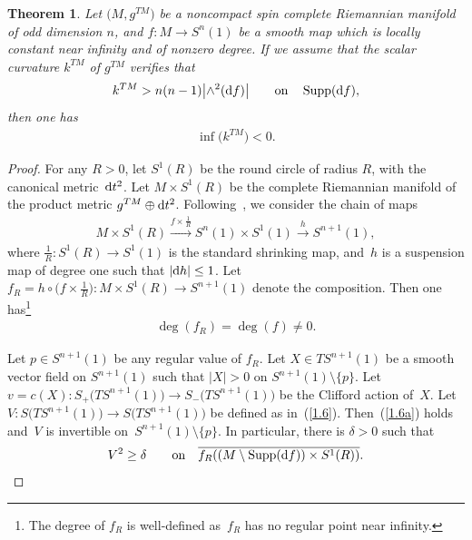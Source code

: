 \documentclass[pdftex]{sigma}
\numberwithin{equation}{section}
\newtheorem{thm}{Theorem}[section]
\theoremstyle{definition}
\begin{document}
\begin{thm}\label{t1.4} Let $\big(M,g^{TM}\big)$ be a noncompact spin complete Riemannian manifold of odd dimension $n$, and $f\colon M\rightarrow S^n(1)$ be a smooth map which is locally constant near infinity and of nonzero degree. If we assume that the scalar curvature $k^{TM}$ of $g^{TM}$ verifies that
\begin{gather}\label{1.24}
k^{TM}> n(n-1)\big|{\wedge}^2({\rm d}f)\big| \qquad {\rm on}\quad \operatorname{Supp}({\rm d}f),
\end{gather}
then one has
\begin{gather}\label{1.25}
\inf\big(k^{TM}\big)<0.
\end{gather}
\end{thm}

\begin{proof} For any $R>0$, let $S^1(R)$ be the round circle of radius $R$, with the canonical met\-ric~${\rm d}t^2$. Let $M\times S^1(R)$ be the complete Riemannian manifold of the product metric $g^{TM}\oplus {\rm d}t^2$. Follo\-wing~\cite{L98}, we consider the chain of maps
\begin{gather*}%
 M\times S^1(R)\xrightarrow{f\times \frac{1}{R}} S^n(1)\times S^1(1) \xrightarrow{h} S^{n+1}(1),
\end{gather*}
where $\frac{1}{R}\colon S^1(R)\rightarrow S^1(1)$ is the standard shrinking map, and~$h$ is a suspension map of degree one such that $|{\rm d}h|\leq 1$. Let $f_R=h\circ \big(f\times \frac{1}{R}\big)\colon M\times S^1(R)\rightarrow S^{n+1}(1)$ denote the composition. Then one has\footnote{The degree of $f_R$ is well-defined as~$f_R$ has no regular point near infinity.}
\begin{gather}\label{1.27}
 \deg (f_R)=\deg (f)\neq 0.
\end{gather}

Let $p\in S^{n+1}(1) $ be any regular value of $f_R$. Let $X\in TS^{n+1}(1)$ be a smooth vector field on $S^{n+1}(1)$ such that $|X|>0$ on $S^{n+1}(1)\setminus \{p\}$.
Let $v=c(X)\colon S_+\big(TS^{n+1}(1)\big)\rightarrow S_-\big(TS^{n+1}(1)\big)$ be the Clifford action of~$X$. Let $V\colon S\big(TS^{n+1}(1)\big)\rightarrow S\big(TS^{n+1}(1)\big)$ be defined as in~(\ref{1.6}). Then~(\ref{1.6a}) holds and~$V$ is invertible on~$ S^{n+1}(1)\setminus \{p\}$. In particular, there is $\delta>0$ such that
\begin{gather}\label{1.29}
V^2 \geq \delta \qquad {\rm on}\quad \overline{f_R((M\setminus \operatorname{Supp}({\rm d}f))\times S^1(R)) }.
\end{gather}


\end{proof}
\end{document}
